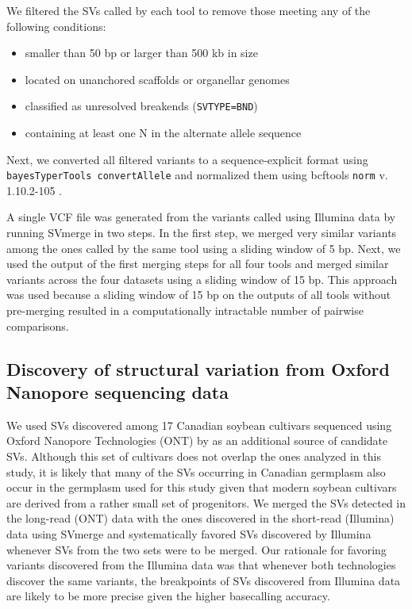 \documentclass[12pt]{article}
\begin{document}
We filtered the SVs called by each tool to remove those meeting any of the following conditions:

\begin{itemize}
	\item smaller than 50 bp or larger than 500 kb in size
	\item located on unanchored scaffolds or organellar genomes
	\item classified as unresolved breakends (\texttt{SVTYPE=BND})
	\item containing at least one N in the alternate allele sequence
\end{itemize}

Next, we converted all filtered variants to a sequence-explicit format using
\texttt{bayesTyperTools convertAllele}  and normalized them
using bcftools \texttt{norm} v. 1.10.2-105 .

A single VCF file was generated from the variants called using Illumina data by
running SVmerge  in two steps. In the first step, we merged
very similar variants among the ones called by the same tool using a
sliding window of 5 bp. Next, we used the output of the first merging steps
for all four tools and merged similar variants across the four datasets using
a sliding window of 15 bp. This approach was used because a
sliding window of 15 bp on the outputs of all tools without pre-merging
resulted in a computationally intractable number of pairwise comparisons.

\subsection*{Discovery of structural variation from Oxford Nanopore sequencing data}
\label{sv-gwas-sv-discovery-ont}

We used SVs discovered among 17 Canadian soybean cultivars sequenced using
Oxford Nano\-pore Technologies (ONT) by  as an additional
source of candidate SVs. Although this set of cultivars does not overlap the
ones analyzed in this study, it is likely that many of the SVs occurring
in Canadian germplasm also occur in the germplasm used for this study given that modern soybean
cultivars are derived from a rather small set of progenitors. We merged the SVs detected in the
long-read (ONT) data with the ones discovered in the short-read (Illumina) data
using SVmerge and systematically favored SVs discovered by Illumina whenever
SVs from the two sets were to be merged.  Our rationale for favoring variants
discovered from the Illumina data was that whenever both technologies discover
the same variants, the breakpoints of SVs discovered from Illumina data are
likely to be more precise given the higher basecalling accuracy.
\end{document}
